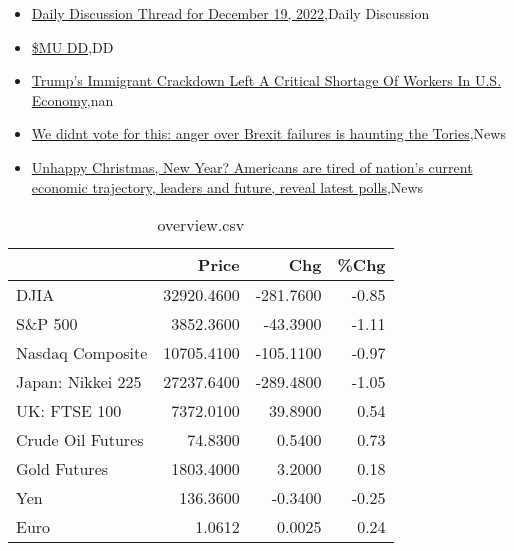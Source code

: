\documentclass{article}%
\begin{document}
%
\begin{itemize}%
\item%
\href{https://reddit.com/r/wallstreetbets/comments/zpojs8/daily\_discussion\_thread\_for\_december\_19\_2022/}{Daily Discussion Thread for December 19, 2022},Daily Discussion%
\item%
\href{https://reddit.com/r/wallstreetbets/comments/zpnen5/mu\_dd/}{\$MU DD},DD%
\item%
\href{https://reddit.com/r/Economics/comments/zpozo7/trumps\_immigrant\_crackdown\_left\_a\_critical/}{Trump's Immigrant Crackdown Left A Critical Shortage Of Workers In U.S. Economy},nan%
\item%
\href{https://reddit.com/r/Economics/comments/zpl718/we\_didnt\_vote\_for\_this\_anger\_over\_brexit\_failures/}{We didnt vote for this: anger over Brexit failures is haunting the Tories},News%
\item%
\href{https://reddit.com/r/Economics/comments/zpkwko/unhappy\_christmas\_new\_year\_americans\_are\_tired\_of/}{Unhappy Christmas, New Year? Americans are tired of nation's current economic trajectory, leaders and future, reveal latest polls},News%
\end{itemize}%


\begin{table}[htbp]%
\caption{overview.csv}%
\centering%
\begin{adjustbox}{width=1\textwidth}%
\begin{tabular}{lrrr}
\toprule
                  &      Price &       Chg &  \%Chg \\
\midrule
             DJIA & 32920.4600 & -281.7600 & -0.85 \\
          S\&P 500 &  3852.3600 &  -43.3900 & -1.11 \\
 Nasdaq Composite & 10705.4100 & -105.1100 & -0.97 \\
Japan: Nikkei 225 & 27237.6400 & -289.4800 & -1.05 \\
     UK: FTSE 100 &  7372.0100 &   39.8900 &  0.54 \\
Crude Oil Futures &    74.8300 &    0.5400 &  0.73 \\
     Gold Futures &  1803.4000 &    3.2000 &  0.18 \\
              Yen &   136.3600 &   -0.3400 & -0.25 \\
             Euro &     1.0612 &    0.0025 &  0.24 \\
\bottomrule
\end{tabular}
%
\end{adjustbox}%
\end{table}
\end{document}
